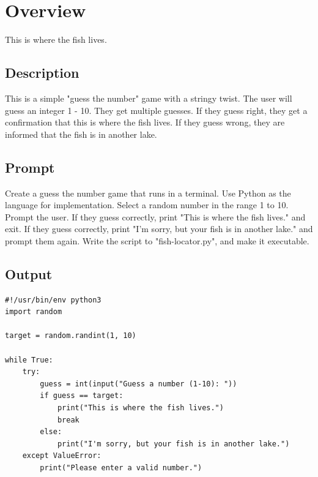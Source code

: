 \documentclass{article}
\begin{document}
\section*{Overview}
This is where the fish lives.

\subsection*{Description}
This is a simple "guess the number" game with a stringy twist. The user will guess an integer 1 - 10. They get multiple guesses. If they guess right, they get a confirmation that this is where the fish lives. If they guess wrong, they are informed that the fish is in another lake.

\subsection*{Prompt}
Create a guess the number game that runs in a terminal. Use Python as the language for implementation. Select a random number in the range 1 to 10. Prompt the user. If they guess correctly, print "This is where the fish lives." and exit. If they guess correctly, print "I'm sorry, but your fish is in another lake." and prompt them again. Write the script to "fish-locator.py", and make it executable.

\subsection*{Output}
\begin{verbatim}
#!/usr/bin/env python3
import random

target = random.randint(1, 10)

while True:
    try:
        guess = int(input("Guess a number (1-10): "))
        if guess == target:
            print("This is where the fish lives.")
            break
        else:
            print("I'm sorry, but your fish is in another lake.")
    except ValueError:
        print("Please enter a valid number.")
\end{verbatim}
\end{document}
